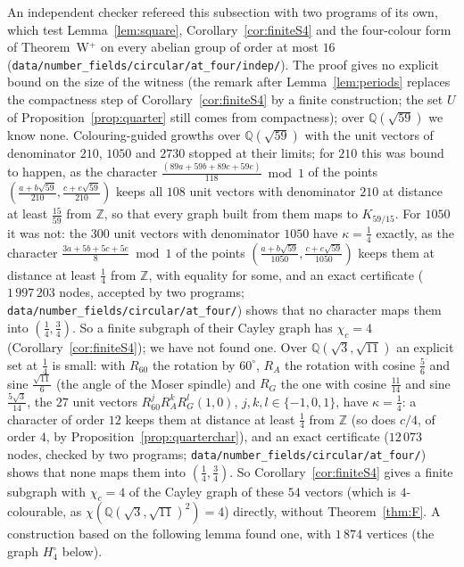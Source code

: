 \documentclass[11pt,a4paper]{amsart}
\theoremstyle{remark}
\newcommand{\Q}{\mathbb{Q}}
\newcommand{\Z}{\mathbb{Z}}
\begin{document}
An independent checker refereed this subsection with two programs of its own, which test Lemma~\ref{lem:square},
Corollary~\ref{cor:finiteS4} and the four-colour form of Theorem~W$^+$ on every abelian group of order at most $16$
(\nolinkurl{data/number_fields/circular/at_four/indep/}). The proof gives no explicit bound on the size of the witness
(the remark after Lemma~\ref{lem:periods} replaces the compactness step of Corollary~\ref{cor:finiteS4} by a finite
construction; the set $U$ of Proposition~\ref{prop:quarter} still comes from compactness); over $\Q(\sqrt{59})$ we
know none. Colouring-guided growths over $\Q(\sqrt{59})$ with the unit vectors of denominator $210$, $1050$ and
$2730$ stopped at their limits; for $210$ this was bound to happen, as the character
$\frac{(89a+59b+89c+59e)}{118}\bmod1$ of the points $(\frac{a+b\sqrt{59}}{210},\frac{c+e\sqrt{59}}{210})$ keeps all
$108$ unit vectors with denominator $210$ at distance at least $\frac{15}{59}$ from $\Z$, so that every graph built
from them maps to $K_{59/15}$. For $1050$ it was not: the $300$ unit vectors with denominator $1050$ have
$\kappa=\frac14$ exactly, as the character $\frac{3a+5b+5c+5e}8\bmod1$ of the points
$(\frac{a+b\sqrt{59}}{1050},\frac{c+e\sqrt{59}}{1050})$ keeps them at distance at least $\frac14$ from $\Z$, with
equality for some, and an exact certificate ($1\,997\,203$ nodes, accepted by two programs;
\nolinkurl{data/number_fields/circular/at_four/}) shows that no character maps them into $(\frac14,\frac34)$. So a
finite subgraph of their Cayley graph has $\chi_c=4$ (Corollary~\ref{cor:finiteS4}); we have not found one. Over $\Q(\sqrt3,\sqrt{11})$ an explicit set at $\frac14$ is small: with $R_{60}$ the rotation by $60^\circ$, $R_A$ the rotation with cosine $\frac56$ and sine $\frac{\sqrt{11}}6$ (the angle of the Moser spindle) and $R_G$ the one with cosine $\frac{11}{14}$ and sine $\frac{5\sqrt3}{14}$, the $27$ unit vectors $R_{60}^jR_A^kR_G^l(1,0)$, $j,k,l\in\{-1,0,1\}$, have $\kappa=\frac14$: a character of order $12$ keeps them at distance at least $\frac14$ from $\Z$ (so does $c/4$, of
order $4$, by Proposition~\ref{prop:quarterchar}), and an exact certificate ($12\,073$ nodes, checked by two programs; \nolinkurl{data/number_fields/circular/at_four/}) shows that none maps them into $(\frac14,\frac34)$. So Corollary~\ref{cor:finiteS4} gives a finite subgraph with $\chi_c=4$ of the Cayley graph of these $54$ vectors
(which is $4$-colourable, as $\chi(\Q(\sqrt3,\sqrt{11})^2)=4$) directly, without Theorem~\ref{thm:F}. A construction
based on the following lemma found one, with $1\,874$ vertices (the graph $H_4^\circ$ below).
\end{document}
